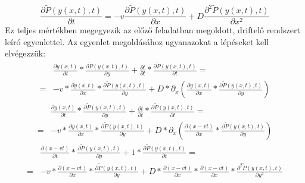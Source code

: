 \begin{equation}
    \frac{\partial \tilde{P} \left( y \left( x, t \right), t \right)}{\partial t}
    =
    -
    v \frac{\partial \tilde{P} \left( y \left( x, t \right), t \right)}{\partial x}
    +
    D \frac{\partial^{2} \tilde{P} \left( y \left( x, t \right), t \right)}{\partial x^{2}}
\end{equation}
Ez teljes mértékben megegyezik az előző feladatban megoldott, driftelő rendszert leíró egyenlettel. Az egyenlet megoldásához ugyanazokat a lépéseket kell elvégezzük:
\begin{align}
    &\frac{\partial y \left( x, t \right)}{\partial t} * \frac{\partial \tilde{P} \left( y \left( x, t \right), t \right)}{\partial y}
    +
    \frac{\partial t}{\partial t} * \frac{\partial \tilde{P} \left( y \left( x, t \right), t \right)}{\partial t}
    = \nonumber \\
    =&
    -
    v * \frac{\partial y \left( x, t \right)}{\partial x} * \frac{\partial \tilde{P} \left( y \left( x, t \right), t \right)}{\partial y}
    +
    D * \partial_{x} \left( \frac{\partial y \left( x, t \right)}{\partial x} * \frac{\partial \tilde{P} \left( y \left( x, t \right), t \right)}{\partial y} \right)
\end{align}
\hrulefill
\begin{align}
    &\frac{\partial y \left( x, t \right)}{\partial t} * \frac{\partial \tilde{P} \left( y \left( x, t \right), t \right)}{\partial y}
    +
    \frac{\partial t}{\partial t} * \frac{\partial \tilde{P} \left( y \left( x, t \right), t \right)}{\partial t}
    = \nonumber \\
    =&
    -
    v * \frac{\partial y \left( x, t \right)}{\partial x} * \frac{\partial \tilde{P} \left( y \left( x, t \right), t \right)}{\partial y}
    +
    D * \partial_{x} \left( \frac{\partial \left( x - vt \right)}{\partial x} * \frac{\partial \tilde{P} \left( y \left( x, t \right), t \right)}{\partial y} \right)
\end{align}
\hrulefill
\begin{align}
    &\frac{\partial \left( x - vt \right)}{\partial t} * \frac{\partial \tilde{P} \left( y \left( x, t \right), t \right)}{\partial y}
    +
    1 * \frac{\partial \tilde{P} \left( y \left( x, t \right), t \right)}{\partial t}
    = \nonumber \\
    =&
    -
    v * \frac{\partial \left( x - vt \right)}{\partial x} * \frac{\partial \tilde{P} \left( y \left( x, t \right), t \right)}{\partial y}
    +
    D * \frac{\partial \left( x - vt \right)}{\partial x} * \frac{\partial \left( x - vt \right)}{\partial x} * \frac{\partial^{2} \tilde{P} \left( y \left( x, t \right), t \right)}{\partial y^{2}}
\end{align}
